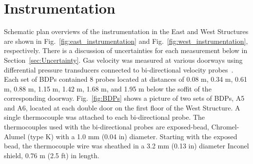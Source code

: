 \documentclass[12pt,oneside]{book}
\begin{document}
\section{Instrumentation}
\label{sec:Instrumentation}
Schematic plan overviews of the instrumentation in the East and West Structures are shown in Fig.~\ref{fig:east_instrumentation} and Fig.~\ref{fig:west_instrumentation}, respectively. There is a discussion of uncertainties for each measurement below in Section~\ref{sec:Uncertainty}. Gas velocity was measured at various doorways using differential pressure transducers connected to bi-directional velocity probes~\cite{McCaffrey:Combustion_and_Flame}. Each set of BDPs contained 8 probes located at distances of 0.08 m, 0.34 m, 0.61 m, 0.88 m, 1.15 m, 1.42 m, 1.68 m, and 1.95 m below the soffit of the corresponding doorway. Fig.~\ref{fig:BDPs} shows a picture of two sets of BDPs, A5 and A6, located at each double door on the first floor of the West Structure. A single thermocouple was attached to each bi-directional probe. The thermocouples used with the bi-directional probes are exposed-bead, Chromel-Alumel (type K) with a 1.0 mm (0.04 in) diameter. Starting with the exposed bead, the thermocouple wire was sheathed in a 3.2 mm (0.13 in) diameter Inconel shield, 0.76 m (2.5 ft) in length.

\end{document}
